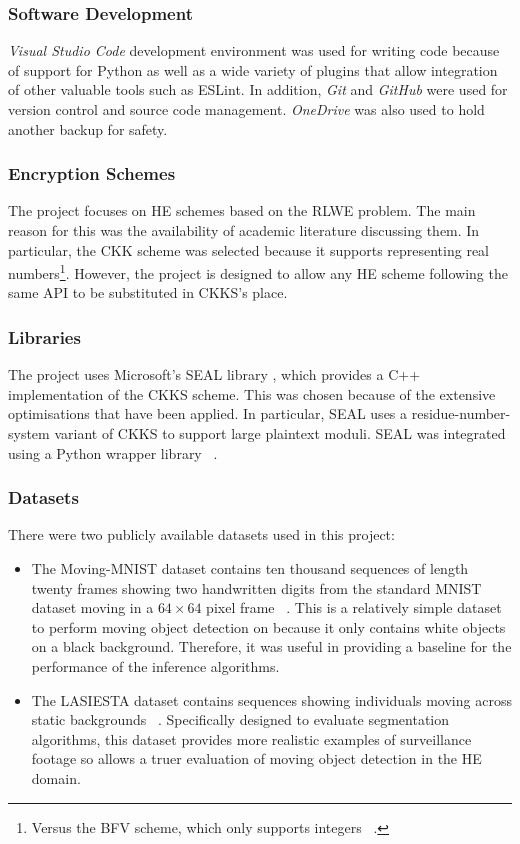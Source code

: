 \subsubsection{Software Development}
\indent \indent
\textit{Visual Studio Code} \cite{VSCode} development environment was used for writing code because of support for Python as well as a wide variety of plugins that allow integration of other valuable tools such as ESLint.  In addition, \textit{Git} \cite{Git} and \textit{GitHub} \cite{Github} were used for version control and source code management. \textit{OneDrive} \cite{OneDrive} was also used to hold another backup for safety.
\subsubsection{Encryption Schemes}
\indent \indent
The project focuses on HE schemes based on the RLWE problem. The main reason for this was the availability of academic literature discussing them. In particular, the CKK scheme \cite{CKKS} was selected because it supports representing real numbers\footnote{Versus the BFV scheme, which only supports integers ~\cite{BFV1, BFV2}.}. However, the project is designed to allow any HE scheme following the same API to be substituted in CKKS's place.
\subsubsection{Libraries}
\indent \indent
The project uses Microsoft's SEAL library \cite{SEAL}, which provides a C++ implementation of the CKKS scheme. This was chosen because of the extensive optimisations that have been applied. In particular, SEAL uses a residue-number-system variant of CKKS to support large plaintext moduli. SEAL was integrated using a Python wrapper library ~\cite{Wrapper}.
\subsubsection{Datasets}
\indent \indent
There were two publicly available datasets used in this project:
\begin{itemize}
    \item The Moving-MNIST dataset contains ten thousand sequences of length twenty frames showing two handwritten digits from the standard MNIST dataset moving in a $64 \times 64$ pixel frame ~\cite{MovingMNIST, MNIST}. This is a relatively simple dataset to perform moving object detection on because it only contains white objects on a black background. Therefore, it was useful in providing a baseline for the performance of the inference algorithms.
    \item The LASIESTA dataset contains sequences showing individuals moving across static backgrounds ~\cite{LASIESTA}. Specifically designed to evaluate segmentation algorithms, this dataset provides more realistic examples of surveillance footage so allows a truer evaluation of moving object detection in the HE domain.
\end{itemize}
